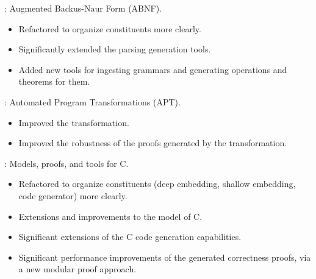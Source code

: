
\begin{frame}

\implibtitle

:
Augmented Backus-Naur Form (ABNF).
\begin{itemize}
\item Refactored to organize constituents more clearly.
\item Significantly extended the parsing generation tools.
\item Added new tools for ingesting grammars
      and generating operations and theorems for them.
\end{itemize}

\end{frame}


\begin{frame}

\implibtitle

:
Automated Program Transformations (APT).
\begin{itemize}
\item Improved the  transformation.
\item Improved the robustness of the proofs
      generated by the  transformation.
\end{itemize}

\end{frame}


\begin{frame}

\implibtitle

:
Models, proofs, and tools for C.
\begin{itemize}
\item Refactored to organize constituents
      (deep embedding, shallow embedding, code generator)
      more clearly.
\item Extensions and improvements to the model of C.
\item Significant extensions of the C code generation capabilities.
\item Significant performance improvements of the generated correctness proofs,
      via a new modular proof approach.
\end{itemize}

\end{frame}

